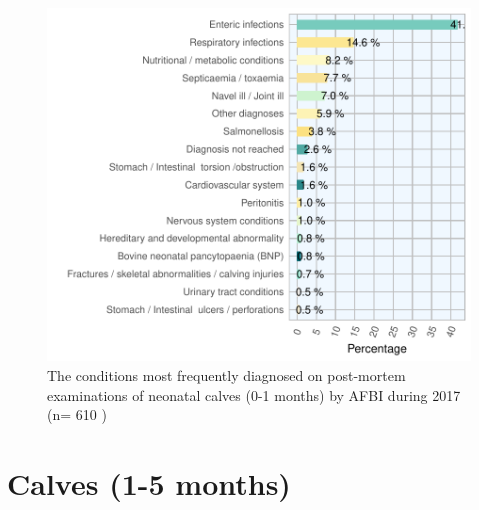 \documentclass[]{book}
\begin{document}
\begin{figure}

{\centering \includegraphics{AFBI_files/figure-latex/unnamed-chunk-7-1} 

}

\caption{The conditions most frequently diagnosed on post-mortem examinations of neonatal calves (0-1 months) by AFBI during 2017 (n= 610 )}\label{fig:unnamed-chunk-7}
\end{figure}

\section{Calves (1-5 months)}\label{calves-1-5-months}
\end{document}
